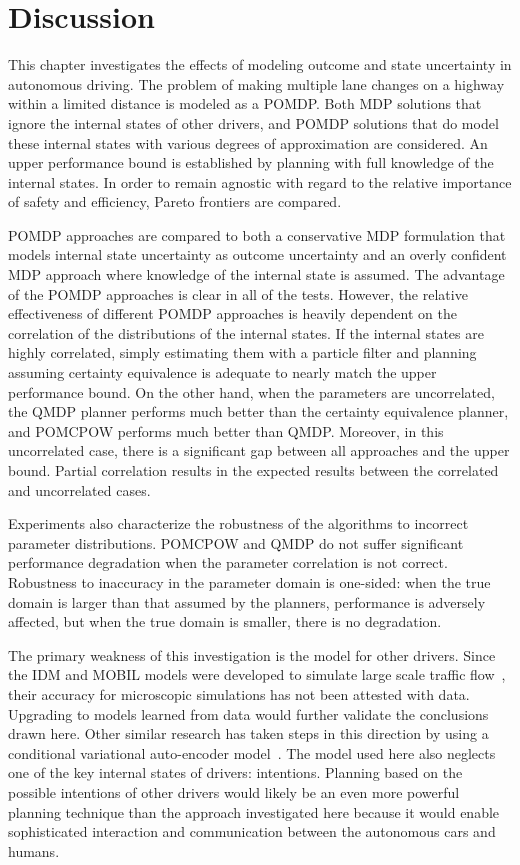 \section{Discussion}

This chapter investigates the effects of modeling outcome and state uncertainty in autonomous driving.
The problem of making multiple lane changes on a highway within a limited distance is modeled as a POMDP.
Both MDP solutions that ignore the internal states of other drivers, and POMDP solutions that do model these internal states with various degrees of approximation are considered.
An upper performance bound is established by planning with full knowledge of the internal states.
In order to remain agnostic with regard to the relative importance of safety and efficiency, Pareto frontiers are compared.

POMDP approaches are compared to both a conservative MDP formulation that models internal state uncertainty as outcome uncertainty and an overly confident MDP approach where knowledge of the internal state is assumed.
The advantage of the POMDP approaches is clear in all of the tests.
However, the relative effectiveness of different POMDP approaches is heavily dependent on the correlation of the distributions of the internal states.
If the internal states are highly correlated, simply estimating them with a particle filter and planning assuming certainty equivalence is adequate to nearly match the upper performance bound.
On the other hand, when the parameters are uncorrelated, the QMDP planner performs much better than the certainty equivalence planner, and POMCPOW performs much better than QMDP.
Moreover, in this uncorrelated case, there is a significant gap between all approaches and the upper bound.
Partial correlation results in the expected results between the correlated and uncorrelated cases.

Experiments also characterize the robustness of the algorithms to incorrect parameter distributions.
POMCPOW and QMDP do not suffer significant performance degradation when the parameter correlation is not correct.
Robustness to inaccuracy in the parameter domain is one-sided: when the true domain is larger than that assumed by the planners, performance is adversely affected, but when the true domain is smaller, there is no degradation.

The primary weakness of this investigation is the model for other drivers.
Since the IDM and MOBIL models were developed to simulate large scale traffic flow~\cite{treiber2000idm,kesting2007mobil}, their accuracy for microscopic simulations has not been attested with data.
Upgrading to models learned from data would further validate the conclusions drawn here.
Other similar research has taken steps in this direction by using a conditional variational auto-encoder model~\cite{schmerling2018multimodal}.
The model used here also neglects one of the key internal states of drivers: intentions.
Planning based on the possible intentions of other drivers would likely be an even more powerful planning technique than the approach investigated here because it would enable sophisticated interaction and communication between the autonomous cars and humans.

